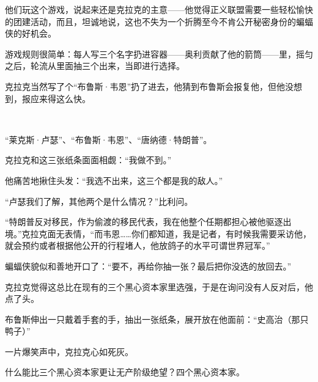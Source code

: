 他们玩这个游戏，说起来还是克拉克的主意——他觉得正义联盟需要一些轻松愉快的团建活动，而且，坦诚地说，这也不失为一个折腾至今不肯公开秘密身份的蝙蝠侠的好机会。

游戏规则很简单：每人写三个名字扔进容器——奥利贡献了他的箭筒——里，摇匀之后，轮流从里面抽三个出来，当即进行选择。

克拉克当然写了个“布鲁斯·韦恩”扔了进去，他猜到布鲁斯会报复他，但他没想到，报应来得这么快。

~\

“莱克斯·卢瑟”、“布鲁斯·韦恩”、“唐纳德·特朗普”。

克拉克和这三张纸条面面相觑：“我做不到。”

他痛苦地揪住头发：“我选不出来，这三个都是我的敌人。”

“卢瑟我们了解，其他两个是什么情况？”比利问。

“特朗普反对移民，作为偷渡的移民代表，我在他整个任期都担心被他驱逐出境。”克拉克面无表情，“而韦恩……你们都知道，我是记者，有时候我需要采访他，就会预约或者根据他公开的行程堵人，他放鸽子的水平可谓世界冠军。”

蝙蝠侠貌似和善地开口了：“要不，再给你抽一张？最后把你没选的放回去。”

克拉克觉得这总比在现有的三个黑心资本家里选强，于是在询问没有人反对后，他点了头。

布鲁斯伸出一只戴着手套的手，抽出一张纸条，展开放在他面前：“史高治（那只鸭子）”

一片爆笑声中，克拉克心如死灰。

什么能比三个黑心资本家更让无产阶级绝望？四个黑心资本家。